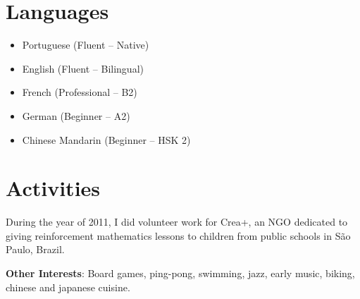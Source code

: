 \documentclass[12pt]{article}
\newcommand{\thesectionicon}{}
\newcommand{\sectionicon}[1]{\renewcommand{\thesectionicon}{#1}}
\begin{document}
\sectionicon{\faLanguage}
\section{Languages}

\begin{minipage}[t]{0.45\textwidth}
\begin{itemize}
\setlength{\itemsep}{0pt}
\item Portuguese (Fluent – Native)
\item English (Fluent – Bilingual)
\item French (Professional – B2)
\end{itemize}
\end{minipage}
\begin{minipage}[t]{0.55\textwidth}
\begin{itemize}
\setlength{\itemsep}{0pt}
\item German (Beginner – A2)
\item Chinese Mandarin (Beginner – HSK 2)
\end{itemize}
\hfill
\end{minipage}

\sectionicon{\faRunning}
\section{Activities}

During the year of 2011, I did volunteer work for Crea+, an NGO dedicated to giving reinforcement mathematics lessons to children from public schools in São Paulo, Brazil.

\smallskip
\textbf{Other Interests}: Board games, ping-pong, swimming, jazz, early music, biking, chinese and japanese cuisine.
\end{document}
